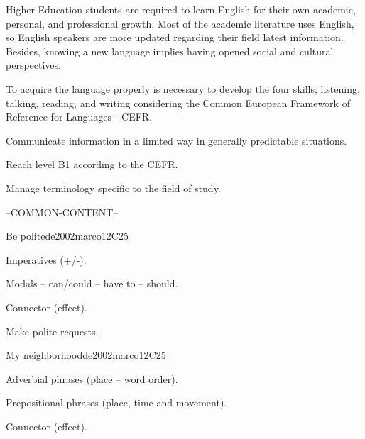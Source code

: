 \begin{syllabus}


\begin{justification}
Higher Education students are required to learn English for their own academic, 
personal, and professional growth. Most of the academic literature uses English, 
so English speakers are more updated regarding their field latest information. 
Besides, knowing a new language implies having opened social and 
cultural perspectives.  

To acquire the language properly is necessary to develop the four skills;
listening, talking, reading, and writing considering the 
Common European Framework of Reference for Languages - CEFR.
\end{justification}

\begin{goals}
\item Communicate information in a limited way in generally predictable situations.
\item Reach level B1 according to the CEFR.
\item Manage terminology specific to the field of study.
\end{goals}

--COMMON-CONTENT--

\begin{unit}{Be polite}{}{de2002marco}{12}{C25}
   \begin{topics}
      \item Imperatives (+/-).
      \item Modals – can/could – have to – should.
      \item Connector (effect).
   \end{topics}

   \begin{learningoutcomes}
      \item Make polite requests.
   \end{learningoutcomes}
\end{unit}

\begin{unit}{My neighborhood}{}{de2002marco}{12}{C25}
   \begin{topics}
      \item Adverbial phrases (place – word order).
      \item Prepositional phrases (place, time and movement).
      \item Connector (effect).
   \end{topics}


\end{unit}
\end{syllabus}
